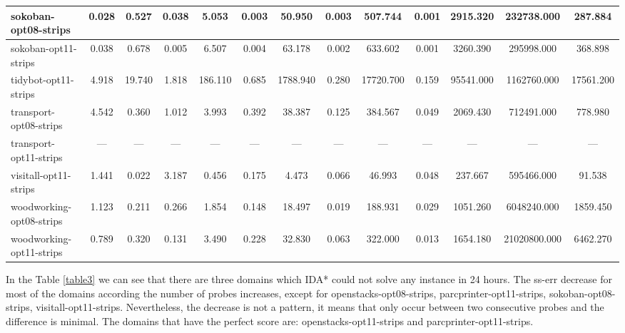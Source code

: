 \documentclass[a4paper,12pt]{article}
\begin{document}
\begin{table}[]
\begin{tabular}{l@{\hspace{2pt}} *{12}{c}}
sokoban-opt08-strips    & 0.028 & 0.527 & 0.038 & 5.053 & 0.003 & 50.950 & 0.003 & 507.744 & 0.001 & 2915.320 & 232738.000 & 287.884 \\ \hline
sokoban-opt11-strips    & 0.038 & 0.678 & 0.005 & 6.507 & 0.004 & 63.178 & 0.002 & 633.602 & 0.001 & 3260.390 & 295998.000 & 368.898 \\ \hline
tidybot-opt11-strips    & 4.918 & 19.740 & 1.818 & 186.110 & 0.685 & 1788.940 & 0.280 & 17720.700 & 0.159 & 95541.000 & 1162760.000 & 17561.200 \\ \hline
transport-opt08-strips  & 4.542 & 0.360 & 1.012 & 3.993 & 0.392 & 38.387 & 0.125 & 384.567 & 0.049 & 2069.430 & 712491.000 & 778.980 \\ \hline
transport-opt11-strips  & --- & --- & --- & --- & --- & --- & --- & --- & --- & --- & --- & --- \\ \hline
visitall-opt11-strips   & 1.441 & 0.022 & 3.187 & 0.456 & 0.175 & 4.473 & 0.066 & 46.993 & 0.048 & 237.667 & 595466.000 & 91.538 \\ \hline
woodworking-opt08-strips& 1.123 & 0.211 & 0.266 & 1.854 & 0.148 & 18.497 & 0.019 & 188.931 & 0.029 & 1051.260 & 6048240.000 & 1859.450 \\ \hline
woodworking-opt11-strips& 0.789 & 0.320 & 0.131 & 3.490 & 0.228 & 32.830 & 0.063 & 322.000 & 0.013 & 1654.180 & 21020800.000 & 6462.270 \\ \hline
\end{tabular}
\end{table}

In the Table \ref{table3} we can see that there are three domains which IDA* could not solve any instance in 24 hours. The ss-err decrease for most of the domains according the number of probes increases, except for openstacks-opt08-strips, parcprinter-opt11-strips, sokoban-opt08-strips, visitall-opt11-strips. Nevertheless, the decrease is not a pattern, it means that only occur between two consecutive probes and the difference is minimal. The domains that have the perfect score are: openstacks-opt11-strips and parcprinter-opt11-strips.

\newpage
\end{document}
